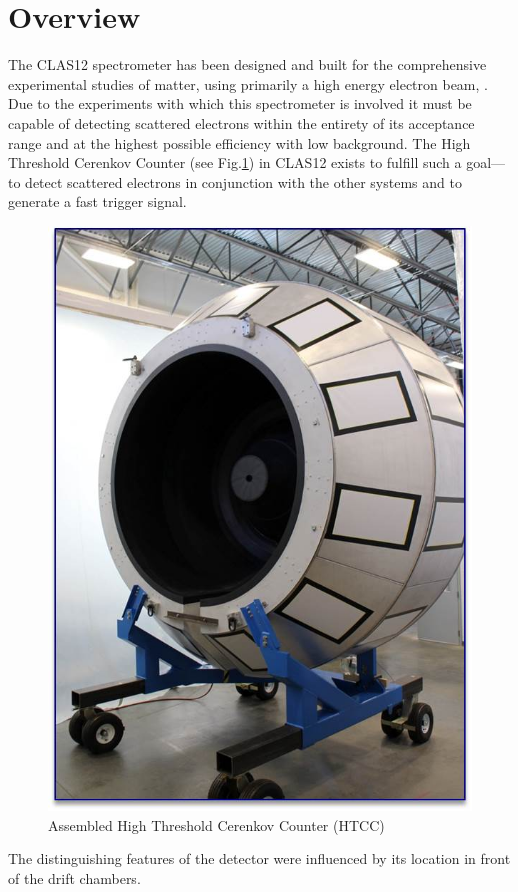 \section{Overview}

The CLAS12 spectrometer has been designed and built for the comprehensive experimental studies of matter, using primarily a high energy electron beam, \cite{youris}. Due to the experiments with which this spectrometer is involved it must be capable of detecting scattered electrons within the entirety of its acceptance range and at the highest possible efficiency with low background. The High Threshold Cerenkov Counter (see Fig.\ref{fig:setup}) in CLAS12 exists to fulfill such a goal---to detect scattered electrons in conjunction with the other systems and to generate a fast trigger signal. 

\begin{figure}[h]
    \centering
    \includegraphics[width=0.75\linewidth]{images/Picture1.jpg}
    \caption{Assembled High Threshold Cerenkov Counter (HTCC)}
    \label{fig:setup}
\end{figure}
The distinguishing features of the detector were influenced by its location in front of the drift chambers. 

